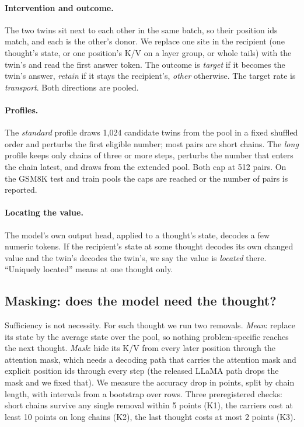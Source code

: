 \documentclass{article}
\begin{document}
\paragraph{Intervention and outcome.} The two twins sit next to each other in the same batch, so their position ids match, and each is the other's donor. We replace one site in the recipient (one thought's state, or one position's K/V on a layer group, or whole tails) with the twin's and read the first answer token. The outcome is \emph{target} if it becomes the twin's answer, \emph{retain} if it stays the recipient's, \emph{other} otherwise. The target rate is \emph{transport}. Both directions are pooled.

\paragraph{Profiles.} The \emph{standard} profile draws 1{,}024 candidate twins from the pool in a fixed shuffled order and perturbs the first eligible number; most pairs are short chains. The \emph{long} profile keeps only chains of three or more steps, perturbs the number that enters the chain latest, and draws from the extended pool. Both cap at 512 pairs. On the GSM8K test and train pools the caps are reached or the number of pairs is reported.

\paragraph{Locating the value.} The model's own output head, applied to a thought's state, decodes a few numeric tokens. If the recipient's state at some thought decodes its own changed value and the twin's decodes the twin's, we say the value is \emph{located} there. ``Uniquely located'' means at one thought only.

\subsection{Masking: does the model need the thought?}

Sufficiency is not necessity. For each thought we run two removals. \emph{Mean}: replace its state by the average state over the pool, so nothing problem-specific reaches the next thought. \emph{Mask}: hide its K/V from every later position through the attention mask, which needs a decoding path that carries the attention mask and explicit position ids through every step (the released LLaMA path drops the mask and we fixed that). We measure the accuracy drop in points, split by chain length, with intervals from a bootstrap over rows. Three preregistered checks: short chains survive any single removal within 5 points (K1), the carriers cost at least 10 points on long chains (K2), the last thought costs at most 2 points (K3).
\end{document}
